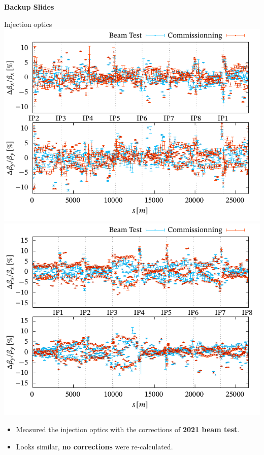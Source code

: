 \documentclass[4pt,usenames,dvipsnames,aspectratio=169,table]{beamer}
\newcommand{\highl}[1]{\textbf{#1}}
\begin{document}

\begin{frame}{}

\begin{center}
{\Huge \textbf{Backup Slides}}
\end{center}
    
\end{frame}




\begin{frame}{Injection optics}
    \includegraphics[width=0.49\linewidth]{images/beamtest/b1_bb.pdf}
    \hfill
    \includegraphics[width=0.49\linewidth]{images/beamtest/b2_bb.pdf}
    
    \begin{itemize}
        \item  Measured the injection optics with the corrections of \highl{2021 beam test}.
        \item Looks similar, \highl{no corrections} were re-calculated.
    \end{itemize}
\end{frame}


\end{document}
